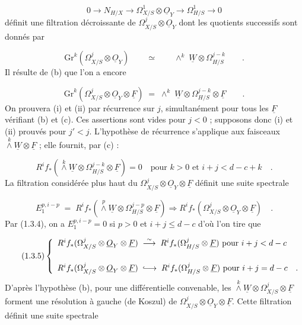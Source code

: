 \begin{equation}\tag{1.3.1}
0 \longrightarrow N_{H/X} \longrightarrow \Omega^1_{X/S} \otimes \underline{O}_Y \longrightarrow \Omega^1_{H/S} \longrightarrow 0
\end{equation}
définit une filtration décroissante de $\Omega^j_{X/S} \otimes \underline{O}_Y$ dont les quotients successifs sont donnés par

\begin{equation}\tag{1.3.2}
\mathrm{Gr}^k(\Omega^j_{X/S} \otimes \underline{O}_Y) \qquad \simeq \qquad \wedge^k \; \underline{W} \otimes \Omega^{j-k}_{H/S} \qquad .
\end{equation}
Il résulte de (b) que l'on a encore

\begin{equation}\tag{1.3.3}
\mathrm{Gr}^k(\Omega^j_{X/S} \otimes \underline{O}_Y \otimes \underline{F}) \;=\; \wedge^k \; \underline{W} \otimes \Omega^{j-k}_{H/S} \otimes \underline{F} \qquad .
\end{equation}
On prouvera (i) et (ii) par récurrence sur $j$, simultanément pour tous les $\underline{F}$ vérifiant (b) et (c). Ces assertions sont vides pour $j < 0$ ;
supposons donc (i) et (ii) prouvés pour $j' < j$. L'hypothèse de récurrence s'applique aux faisceaux $\stackrel{k}{\wedge} \underline{W} \otimes \underline{F}$ ; elle fournit, par (c) :

\begin{equation}\tag{1.3.4}
R^i f_* ( \stackrel{k}{\wedge}\underline{W} \otimes \Omega^{j-k}_{H/S} \otimes \underline{F}) = 0 \quad \mbox{pour } k > 0 \mbox{ et } i+j < d-c+k \quad .
\end{equation}
La filtration considérée plus haut du $\Omega^j_{X/S} \otimes \underline{O}_Y \otimes \underline{F}$ définit une suite spectrale

\begin{equation*}
E_1^{p,i-p} \; = \; R^i f_*( \stackrel{p}{\wedge} \underline{W} \otimes \Omega^{j-p}_{H/S} \otimes \underline{F}) \Longrightarrow R^i f_*(\Omega^j_{X/S} \otimes \underline{O}_Y \otimes \underline{F}) \quad .
\end{equation*}
Par (1.3.4), on a $E_1^{p,i-p} = 0$ si $p > 0$ et $i+j \leq d-c$ d'où l'on tire que

\begin{equation}\tag{1.3.5}
\left\{ \begin{array}{l} R^i f_*(\Omega^j_{X/S} \otimes \underline{O}_Y \otimes \underline{F}) \; \stackrel{\sim}{\longrightarrow} \; R^i f_*(\Omega^j_{H/S} \otimes \underline{F}) \mbox{ pour } i+j < d-c \\[4ex] R^i f_*(\Omega^j_{X/S} \otimes \underline{O}_Y \otimes \underline{F}) \; \lhook\joinrel\longrightarrow \; R^i f_*(\Omega^j_{H/S} \otimes \underline{F}) \mbox{ pour } i+j = d-c \quad . \end{array} \right.
\end{equation}
D'après l'hypothèse (b), pour une différentielle convenable, les $\stackrel{k}{\wedge} \underline{W} \otimes \Omega^j_{X/S} \otimes \underline{F}$ forment une résolution à gauche (de Koszul) de $\Omega^j_{X/S} \otimes \underline{O}_Y \otimes \underline{F}$. Cette filtration définit une suite spectrale


